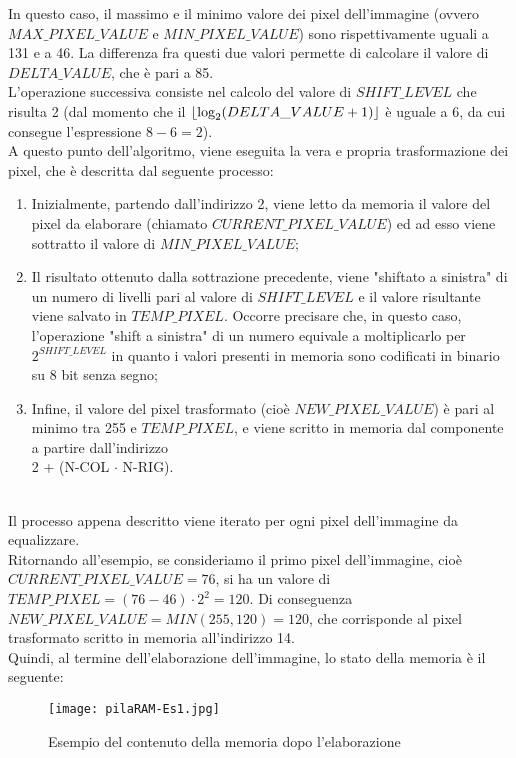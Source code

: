 \documentclass{article}
\DeclarePairedDelimiter\floor{\lfloor}{\rfloor}
\begin{document}
\noindent In questo caso, il massimo e il minimo valore dei pixel dell'immagine (ovvero $MAX\_PIXEL\_VALUE$ e $MIN\_PIXEL\_VALUE$) sono rispettivamente uguali a 131 e a 46. La differenza fra questi due valori permette di calcolare il valore di $DELTA\_VALUE$, che è pari a 85.\\
L'operazione successiva consiste nel calcolo del valore di $SHIFT\_LEVEL$ che risulta 2 (dal momento che il $\floor*{\log_{2}(DELTA\_VALUE + 1)}$ è uguale a 6, da cui consegue l'espressione $8 - 6 = 2$).\\
A questo punto dell'algoritmo, viene eseguita la vera e propria trasformazione dei pixel, che è descritta dal seguente processo:\\
\begin{enumerate}
	\item Inizialmente, partendo dall'indirizzo 2, viene letto da memoria il valore del pixel da elaborare (chiamato $CURRENT\_PIXEL\_VALUE$) ed ad esso viene sottratto il valore di $MIN\_PIXEL\_VALUE$;
	\item Il risultato ottenuto dalla sottrazione precedente, viene "shiftato a sinistra" di un numero di livelli pari al valore di $SHIFT\_LEVEL$ e il valore risultante viene salvato in $TEMP\_PIXEL$. Occorre precisare che, in questo caso, l'operazione "shift a sinistra" di un numero equivale a moltiplicarlo per $2^{SHIFT\_LEVEL}$ in quanto i valori presenti in memoria sono codificati in binario su 8 bit senza segno;
	\item Infine, il valore del pixel trasformato (cioè $NEW\_PIXEL\_VALUE$) è pari al minimo tra 255 e $TEMP\_PIXEL$, e viene scritto in memoria dal componente a partire dall'indirizzo \\ 2 + (N-COL $\cdot$ N-RIG).
\end{enumerate}

\noindent \\ Il processo appena descritto viene iterato per ogni pixel dell'immagine da equalizzare.\\
Ritornando all'esempio, se consideriamo il primo pixel dell'immagine, cioè \\ $CURRENT\_PIXEL\_VALUE = 76$, si ha un valore di $TEMP\_PIXEL = (76 - 46) \cdot 2^{2} = 120$. Di conseguenza $NEW\_PIXEL\_VALUE = MIN\left( 255, 120 \right) = 120$, che corrisponde al pixel trasformato scritto in memoria all'indirizzo 14.\\
Quindi, al termine dell'elaborazione dell'immagine, lo stato della memoria è il seguente:

\begin{figure}[H]
	\centering
	\texttt{[image: pilaRAM-Es1.jpg]}
	\caption{Esempio del contenuto della memoria dopo l'elaborazione}
\end{figure}
\end{document}
